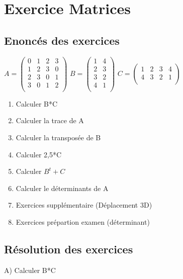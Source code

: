 
\newpage
\section{Exercice Matrices}
\vspace{10mm} %
\subsection{Enoncés des exercices}
\vspace{5mm} %

$
A =
\begin{pmatrix}
  0 & 1 & 2 & 3 \\
  1 & 2 & 3 & 0 \\
  2 & 3 & 0 & 1 \\
  3 & 0 & 1 & 2 \\
\end{pmatrix}
$
\vspace{5mm} %
$
B =
\begin{pmatrix}
  1 & 4 \\
  2 & 3 \\
  3 & 2 \\
  4 & 1 \\
\end{pmatrix}
$
\vspace{5mm} %
$
C =
\begin{pmatrix}
  1 & 2 & 3 & 4 \\
  4 & 3 & 2 & 1 \\
\end{pmatrix}
$
\vspace{3mm} %

\begin{enumerate}[label=\Alph*)]
\item Calculer B*C
\item Calculer la trace de A
\item Calculer la transposée de B
\item Calculer 2,5*C
\item Calculer $B^{t}+C$
\item Calculer le déterminants de A
\item Exercices supplémentaire (Déplacement 3D)
\item Exercices prépartion examen (déterminant)
\end{enumerate}

\newpage

\subsection{Résolution des exercices}
\vspace{5mm} %
A) Calculer B*C
\vspace{10mm} %

